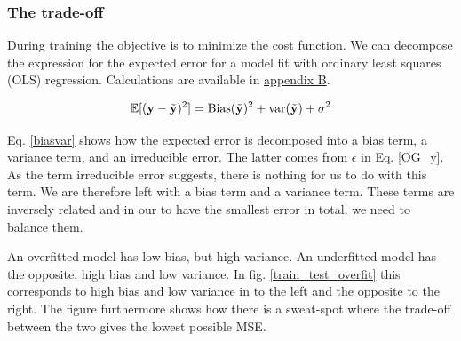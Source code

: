 \subsubsection{The trade-off}


During training the objective is to minimize the cost function.  We can decompose the expression for the expected error for a model fit with ordinary least squares (OLS) regression. Calculations are available in \hyperref[appendixB]{appendix B}.

\begin{equation}\label{biasvar}
    \mathbb{E}[(\mathbf{y} - \Tilde{\mathbf{y}})^2] = \text{Bias}(\Tilde{\mathbf{y}})^2 + \text{var}(\Tilde{\mathbf{y}}) + \sigma^2
\end{equation}

Eq. \ref{biasvar} shows how the expected error is decomposed into a bias term, a variance term, and an irreducible error. The latter comes from $\epsilon$ in Eq. \ref{OG_y}. As the term irreducible error suggests, there is nothing for us to do with this term. We are therefore left with a bias term and a variance term. These terms are inversely related and in our to have the smallest error in total, we need to balance them. 

An overfitted model has low bias, but high variance. An underfitted model has the opposite, high bias and low variance. In fig. \ref{train_test_overfit} this corresponds to high bias and low variance in to the left and the opposite to the right. The figure furthermore shows how there is a sweat-spot where the trade-off between the two gives the lowest possible MSE.



